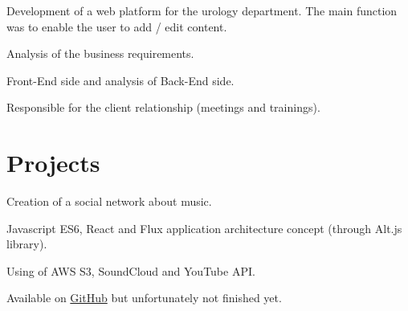\documentclass[letterpaper]{my-resume} %
\begin{document}
\begin{minipage}[t]{0.66\textwidth}
\sectionspace %



Development of a web platform for the urology department. The main function was to enable the user to add / edit content.
\begin{tightitemize}
\item Analysis of the business requirements.
\item Front-End side and analysis of Back-End side.
\item Responsible for the client relationship (meetings and trainings).
\end{tightitemize}

\sectionspace %


\section{Projects}

Creation of a social network about music.
\begin{tightitemize}
\item Javascript ES6, React and Flux application architecture concept (through Alt.js library).
\item Using of AWS S3, SoundCloud and YouTube API.
\item Available on \href{https://github.com/bokzor/musicShare}{GitHub} but unfortunately not finished yet.
\end{tightitemize}


\end{minipage}
\end{document}

